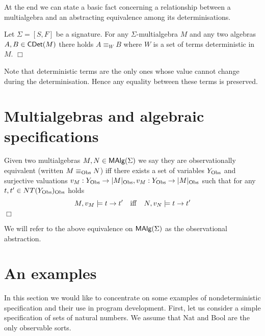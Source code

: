 At the end we can state a basic fact concerning a relationship between
a multialgebra and an abstracting equivalence among its
determinisations.

\begin{Lemma}
Let $\Sigma = [S,F]$ be a signature. For any $\Sigma$-multialgebra $M$ and
any two algebras $A,B \in \mbox{\sf CDet}(M)$ there holds $A \equiv_W B$ where $W$ is
a set of terms deterministic in $M$.
\hfill$\Box$
\end{Lemma}   

\begin{Proof} 
Note that deterministic terms are the only ones whose
value cannot change during the determinisation. Hence any equality
between these terms is preserved.  
\end{Proof}


%

\section{Multialgebras and algebraic specifications}



\begin{Definition} 
Given two multialgebras $M,N \in \mbox{\rm\sf MAlg}(\Sigma)$ we say they are
observationally equivalent (written $M \equiv_{\rm Obs} N$) iff there exists a set
of variables $Y_{\rm Obs}$ and surjective valuations $v_M: Y_{\rm Obs} \rightarrow
|M|_{\rm Obs}, v_M: Y_{\rm Obs} \rightarrow |M|_{\rm Obs}$ such that for any $t,t' \in
NT(Y_{\rm Obs})_{\rm Obs}$ holds
\[
M,v_M \models t \rightarrow t' \quad {\rm iff} \quad N,v_N \models t \rightarrow t'
\]
\hfill$\Box$
\end{Definition}
%
We will refer to the above equivalence on $\mbox{\rm\sf MAlg}(\Sigma)$ as the
observational abstraction. 


%

\section{An examples}


In this section we would like to concentrate on some examples of
nondeterministic specification and their use in program development.
First, let us consider a simple specification of sets of natural
numbers. We assume that {\sf Nat} and {\sf Bool} are the only
observable sorts.

